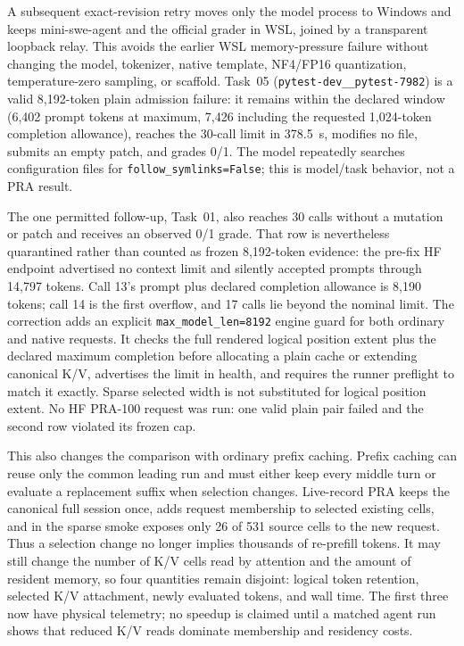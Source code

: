 \documentclass[11pt]{article}
\begin{document}
A subsequent exact-revision retry moves only the model process to Windows and
keeps mini-swe-agent and the official grader in WSL, joined by a transparent
loopback relay.  This avoids the earlier WSL memory-pressure failure without
changing the model, tokenizer, native template, NF4/FP16 quantization,
temperature-zero sampling, or scaffold.  Task~05
(\texttt{pytest-dev\_\_pytest-7982}) is a valid 8,192-token plain admission
failure: it remains within the declared window (6,402 prompt tokens at maximum,
7,426 including the requested 1,024-token completion allowance), reaches the
30-call limit in 378.5~s, modifies no file, submits an empty patch, and grades
0/1.  The model repeatedly searches configuration files for
\texttt{follow\_symlinks=False}; this is model/task behavior, not a PRA result.

The one permitted follow-up, Task~01, also reaches 30 calls without a mutation
or patch and receives an observed 0/1 grade.  That row is nevertheless
quarantined rather than counted as frozen 8,192-token evidence: the pre-fix HF
endpoint advertised no context limit and silently accepted prompts through
14,797 tokens.  Call 13's prompt plus declared completion allowance is 8,190
tokens; call 14 is the first overflow, and 17 calls lie beyond the nominal
limit.  The correction adds an explicit \texttt{max\_model\_len=8192} engine
guard for both ordinary and native requests.  It checks the full rendered
logical position extent plus the declared maximum completion before allocating
a plain cache or extending canonical K/V, advertises the limit in health, and
requires the runner preflight to match it exactly.  Sparse selected width is
not substituted for logical position extent.  No HF PRA-100 request was run:
one valid plain pair failed and the second row violated its frozen cap.

This also changes the comparison with ordinary prefix caching. Prefix caching
can reuse only the common leading run and must either keep every middle turn or
evaluate a replacement suffix when selection changes. Live-record PRA keeps
the canonical full session once, adds request membership to selected existing
cells, and in the sparse smoke exposes only 26 of 531 source cells to the new
request. Thus a selection change no longer implies thousands of re-prefill
tokens. It may still change the number of K/V cells read by attention and the
amount of resident memory, so four quantities remain disjoint: logical token
retention, selected K/V attachment, newly evaluated tokens, and wall time. The
first three now have physical telemetry; no speedup is claimed until a matched
agent run shows that reduced K/V reads dominate membership and residency costs.
\end{document}
